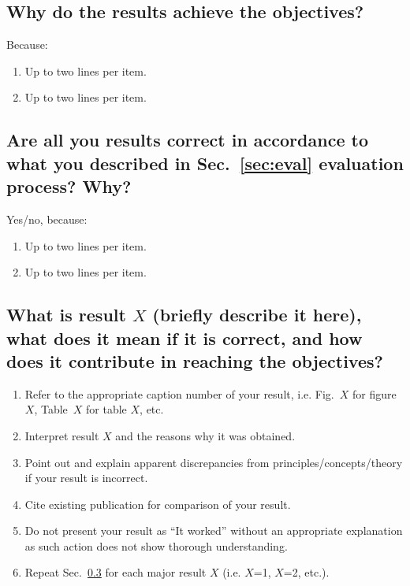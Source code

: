 \subsection{Why do the results achieve the objectives?}
Because:
\begin{enumerate}
	\item Up to two lines per item.
	\item Up to two lines per item.
\end{enumerate}

\subsection{Are all you results correct  in accordance to what you described in Sec.~\ref{sec:eval} evaluation process? Why?} 
Yes/no, because:
\begin{enumerate}
	\item Up to two lines per item.
	\item Up to two lines per item.
\end{enumerate}

\subsection{What is result $X$ (briefly describe it here), what does it mean if it is correct, and how does it contribute in reaching the objectives?}
\label{sec:resn}

\begin{enumerate}		
	\item Refer to the appropriate caption number  of your result, i.e. Fig.~$X$ for figure $X$, Table~$X$ for table $X$, etc.	
	\item Interpret result $X$ and the reasons why it was obtained. 
	
	\item Point out and explain apparent discrepancies from principles/concepts/theory if your result is incorrect.
	
	\item Cite existing publication for comparison of your result.
	
	\item Do not present your result as ``It worked'' without an appropriate explanation as such action does not show thorough understanding.
	
	
	\item Repeat Sec.~\ref{sec:resn} for each major result $X$ (i.e. $X$=1, $X$=2, etc.).		
\end{enumerate}

